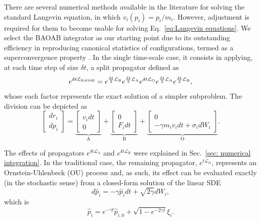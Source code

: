 \documentclass[
aip,
jcp,
reprint,
]{revtex4-1}
\begin{document}
There are several numerical methods available in the literature for solving the standard Langevin equation, in which $v_i(p_i) = p_i/m_i$.
However, adjustment is required for them to become usable for solving Eq.~\eqref{eq:Langevin equations}.
We select the BAOAB integrator \cite{Leimkuhler_2012, Leimkuhler_2013_2} as our starting point due to its outstanding efficiency in reproducing canonical statistics of configurations, termed as a superconvergence property \cite{Leimkuhler_2012}.
In the single time-scale case, it consists in applying, at each time step of size $\delta t$, a split propagator defined as
\begin{equation}
e^{\delta t \mathcal{L}_\textsc{BAOAB}} =
e^{\frac{\delta t}{2} \mathcal{L}_\mathrm{B}}
e^{\frac{\delta t}{2} \mathcal{L}_\mathrm{A}}
e^{\delta t \mathcal{L}_\mathrm{O}}
e^{\frac{\delta t}{2} \mathcal{L}_\mathrm{A}}
e^{\frac{\delta t}{2} \mathcal{L}_\mathrm{B}},
\end{equation}
whose each factor represents the exact solution of a simpler subproblem.
The division can be depicted \cite{Leimkuhler_2015} as
\begin{equation}
\left[\begin{array}{c}
dr_i \\ dp_i
\end{array}\right] =
\underbrace{\left[\begin{array}{c}
v_i dt \\ 0
\end{array}\right]}_\mathrm{A} + 
\underbrace{\left[\begin{array}{c}
0 \\ F_i dt
\end{array}\right]}_\mathrm{B} +
\underbrace{\left[\begin{array}{c}
0 \\ -\gamma m_i v_i dt + \sigma_i dW_i
\end{array}\right]}_\mathrm{O}.
\end{equation}

The effects of propagators $e^{\delta t \mathcal{L}_\mathrm{A}}$ and $e^{\delta t \mathcal{L}_\mathrm{B}}$ were explained in Sec.~\ref{sec: numerical integration}.
In the traditional case, the remaining propagator, $e^{t \mathcal{L}_\mathrm{O}}$, represents an Ornstein-Uhlenbeck (OU) process and, as such, its effect can be evaluated exactly (in the stochastic sense) from a closed-form solution of the linear SDE
\begin{equation}
\label{eq:traditional Langevin}
d\hat{p}_i = - \gamma \hat{p}_i dt + \sqrt{2 \gamma} dW_i,
\end{equation}
which is
\begin{equation}
\label{eq:Ornestein-Uhlenbeck solution}
\hat{p}_i = e^{-\gamma t} \hat{p}_{i,0} + \sqrt{1 - e^{-2 \gamma t}} \xi_i.
\end{equation}
\end{document}
